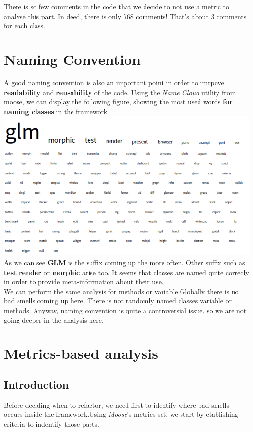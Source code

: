 \documentclass[11pt,a4paper]{article}
\begin{document}
There is so few comments in the code that we decide to not use a metric to analyse this part. In deed, there is only 768 comments! That's about 3 comments for each class.
\section{Naming Convention}

A good naming convention is also an important point in order to imrpove \textbf{readability} and \textbf{reusability} of the code. Using the \textit{Name Cloud} utility from moose, we can display the following figure, showing the most used words \textbf{for naming classes} in the framework.\\
\includegraphics[width=\textwidth]{name_cloud}
\\
As we can see \textbf{GLM} is the suffix coming up the more often. Other suffix such as \textbf{test} \textbf{render} or \textbf{morphic} arise too. It seems that classes are named quite correcly in order to provide meta-information about their use.\\

We can perform the same analysis for methods or variable.Globally there is no bad smells coming up here. There is not randomly named classes variable or methods. Anyway, naming convention is quite a controversial issue, so we are not going deeper in the analysis here. 
\section{Metrics-based analysis}
\subsection{Introduction}
Before deciding when to refactor, we need first to identify where bad smells occurs inside the framework.Using \textit{Moose}'s metrics set, we start by etablishing criteria to indentify those parts.\\ 
\end{document}
